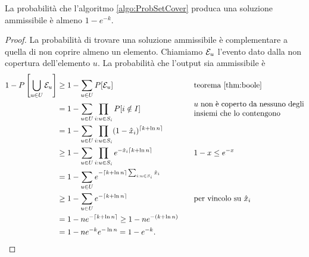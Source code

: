 \begin{theorem}\label{thm:ammisetcover}
	La probabilità che l'algoritmo \ref{algo:ProbSetCover} produca una soluzione ammissibile è almeno $1-e^{-k}$.
\end{theorem}
\begin{proof}
	La probabilità di trovare una soluzione ammissibile è complementare a quella di non coprire almeno un elemento.
	Chiamiamo $\mathcal E_u$ l'evento dato dalla non copertura dell'elemento $u$.
	La probabilità che l'output sia ammissibile è
	\begin{align*}
		1-P\left[\bigcup_{u\in U} \eve_u\right] & \geq 1-\sum_{u\in U} P[\eve_u]                                     &  & \quad \text{teorema \ref{thm:boole}}                                             \\
		                                        & = 1-\sum_{u\in U}\prod_{i:u\in S_i} P[i\notin I]                   &  & \quad \parbox{5cm}{$u$ non è coperto da nessuno degli insiemi che lo contengono} \\
		                                        & = 1-\sum_{u\in U}\prod_{i:u\in S_i} (1-\hat x_i)^{\ceil{k+\ln n}}                                                                                        \\
		                                        & \geq 1-\sum_{u\in U}\prod_{i:u\in S_i} e^{-\hat x_i\ceil{k+\ln n}} &  & \quad \text{$1-x\leq e^{-x}$}                                                    \\
		                                        & = 1-\sum_{u\in U} e^{-\ceil{k+\ln n}\sum_{i:u\in S_i} \hat x_i}                                                                                          \\
		                                        & \geq 1-\sum_{u\in U} e^{-\ceil{k+\ln n}}                           &  & \quad \text{per vincolo su $\hat x_i$}                                           \\
		                                        & = 1-ne^{-\ceil{k+\ln n}} \geq 1-ne^{-(k+\ln n)}                                                                                                          \\
		                                        & = 1-ne^{-k}e^{-\ln n} = 1-e^{-k} \text.
	\end{align*}
\end{proof}

